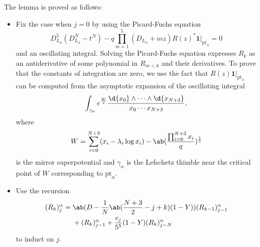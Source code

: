 \documentclass[10pt,oldfontcommands,oneside]{memoir}
\theoremstyle{definition}
\theoremstyle{remark}
\theoremstyle{plain}
\theoremstyle{definition}
\theoremstyle{remark}
\newcommand{\mr}[1]{\mathrm{#1}}
\newcommand{\1}{\mathbf{1}}
\newcommand{\2}{\mathbf{2}}
\newcommand{\3}{\mathbf{3}}
\newcommand{\pt}{\mr{pt}}
\begin{document}
The lemma is proved as follows:
\begin{itemize}
    \item Fix the case when $j=0$ by using the Picard-Fuchs equation
        \[ D_{L_{\alpha}}^5 (D_{L_{\alpha}}^N - t^N) - q \prod_{m=1}^5 (D_{L_{\alpha}} + mz) R(z)^* \1|_{\pt_{\alpha}} = 0 \]
        and an oscillating integral. Solving the Picard-Fuchs equation expresses $R_k$ as an antiderivative of some polynomial in $R_{m < k}$ and their derivatives. To prove that the constants of integration are zero, we use the fact that $R(z)\1 |_{\pt_{\alpha}}$ can be computed from the asymptotic expansion of the oscillating integral
        \[ \int_{\gamma_{\alpha}} e^{\frac{W}{z}} \frac{\d{x_0} \wedge \cdots \wedge \d{x_{N+3}}}{x_0 \cdots x_{N+3}}, \]
        where
        \[ W = \sum_{i=0}^{N+3} (x_i - \lambda_i \log x_i) - \ab( \frac{\prod_{i=0}^{N+3}x_i}{q} )^{\frac{1}{5}} \]
        is the mirror superpotential and $\gamma_{\alpha}$ is the Lefschetz thimble near the critical point of $W$ corresponding to $\pt_{\alpha}$.
    \item Use the recursion
        \begin{align*}
            (R_k)_j^{\alpha} ={}& \ab(D - \frac{1}{N}\ab(\frac{N+3}{2} - j+k)(1-Y)) (R_{k-1})_{j-1}^{\alpha} \\
            &+ (R_k)_{j-1}^{\alpha} + \frac{c_j}{5^5}(1-Y) (R_k)_{j-N}^{\alpha}
        \end{align*}
        to induct on $j$.
\end{itemize}
\end{document}
